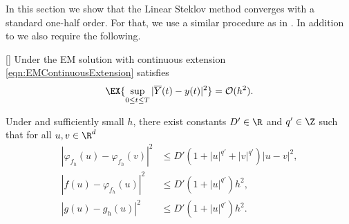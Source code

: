 	In this section we show that the Linear Steklov method 
 converges  with a standard one-half order. For that,
we use a similar procedure  as in  \cite{Higham2002b}. In addition 
to  we also require the following.
 
 

 \begin{thm}\label{thm:EulerConvergenceRateHMS}[{\citet[Thm 4.4]{Higham2002b}}]
 	Under  the EM solution with continuous extension 
 	\eqref{eqn:EMContinuousExtension} satisfies
 	\begin{equation}
	 	\EX{
	 		\sup_{0\leq t \leq T}
	 		|\overline{Y}(t)- y(t)|^2
	 	} = \mathcal{O}(h^2).
 	\end{equation}
 \end{thm}
  
\begin{lem}
	Under  and sufficiently small $h$, there exist
	constants $D'\in \R$ and $q'\in \Z$ such that for all $u,v\in \R^d$
	\begin{align}
		|
			\varphi_{f_h}(u)
			-\varphi_{f_h}(v)
		|^2 
		&\leq
			D'
			\left(
				1 +|u|^{q'} +|v|^{q'}
			\right)
			|u-v|^2, \\
		|
			 f(u) -\varphi_{f_h}(u)
		|^2 
		&\leq
			D'
			\left(
				1 +|u|^{q'} 
				\right)
			h^2, \\
		|
			g(u) -g_h(u)
		|^2 				 
		&\leq
			D'
			\left(
				1 +|u|^{q'} 
			\right)
			h^2 . \label{eqn:ghPolyGrowth}
	\end{align}
\end{lem}

